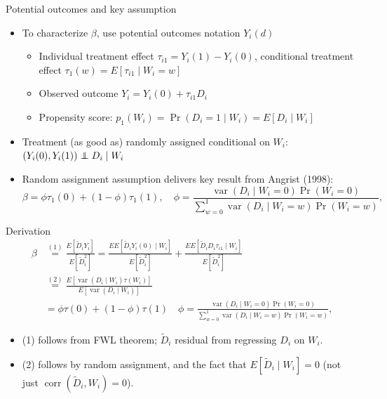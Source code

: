 \documentclass[notes,11pt, aspectratio=169]{beamer}
\def\independenT#1#2{\mathrel{\rlap{$#1#2$}\mkern2mu{#1#2}}}
\newcommand\indep{\protect\mathpalette{\protect\independenT}{\perp}}
\DeclareMathOperator{\var}{var}
\newcommand\1{\operatorname{\mathbbm{1}}\indicatorfence}
\begin{document}
\begin{frame}{Potential outcomes and key assumption}
  \begin{itemize}
  \item To characterize $\beta$, use potential outcomes notation $Y_{i}(d)$
    \begin{itemize}
    \item Individual treatment effect $\tau_{i1} = Y_{i}(1) - Y_{i}(0)$,
      conditional treatment effect $\tau_{1}(w) = E[\tau_{i1}\mid W_{i} = w]$
    \item Observed outcome $Y_{i} = Y_{i}(0) + \tau_{i1}D_{i}$
    \item Propensity score:
      $p_{1}(W_{i}) = \Pr(D_{i} = 1 \mid W_{i}) = E[D_{i} \mid W_{i}]$
    \end{itemize}
  \item Treatment (as good as) randomly assigned conditional on $W_{i}$:
    $\left(Y_i(0),Y_i(1)\right)\indep D_i\mid W_i$
  \item Random assignment assumption delivers key result from Angrist (1998):
    \begin{equation*}
      \beta=\phi\tau_{1}(0)+(1-\phi)\tau_{1}(1),\quad
      \phi= \frac{\var(D_i\mid W_i=0)\Pr(W_i=0)}{\sum_{w=0}^{1}
        \var(D_i\mid W_i=w)\Pr(W_i=w)},
    \end{equation*}
  \end{itemize}
\end{frame}

\begin{frame}{Derivation}
  \small
  \begin{equation*}
    \begin{split}
      \beta&\overset{(1)}{=}\frac{E[\tilde{D}_{i}Y_i]}{E[\tilde{D}_i^2]}
      =\frac{EE[\tilde{D}_{i}Y_i(0)\mid
        W_{i}]}{E[\tilde{D}_i^2]}+\frac{EE[\tilde{D}_{i} D_{i}\tau_{i1}\mid W_{i}]}{E[\tilde{D}_i^2]}\\
      & \overset{(2)}{=}\frac{E[\var(D_{i}\mid W_{i})\tau(W_i)]}{E[\var(D_{i}\mid W_{i})]}\\
      & =\phi\tau(0)+(1-\phi)\tau(1)\quad \phi= \frac{\var(D_i\mid
        W_i=0)\Pr(W_i=0)}{\sum_{w=0}^{1} \var(D_i\mid W_i=w)\Pr(W_i=w)},
    \end{split}
  \end{equation*}
  \begin{itemize}
  \item (1) follows from FWL theorem; $\tilde{D}_{i}$ residual from regressing
    $D_{i}$ on $W_{i}$.
  \item (2) follows by random assignment, and the fact that
    $E[\tilde{D}_{i}\mid W_{i}]=0$ (not just
    $\operatorname{corr}(\tilde{D}_{i},W_{i})=0$).
  \end{itemize}
\end{frame}
\end{document}
